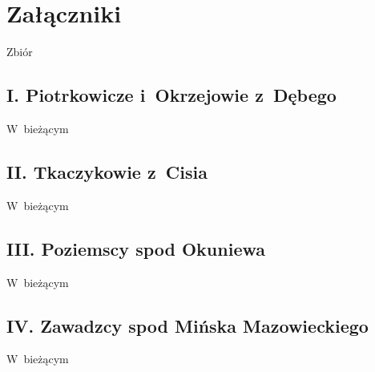 \chapter*{Załączniki}

Zbiór

\section*{I. Piotrkowicze i~Okrzejowie z~Dębego}

W~bieżącym

\section*{II. Tkaczykowie z~Cisia}

W~bieżącym

\section*{III. Poziemscy spod Okuniewa}

W~bieżącym

\section*{IV. Zawadzcy spod Mińska Mazowieckiego}
\label{sec:zawadzcy}

W~bieżącym